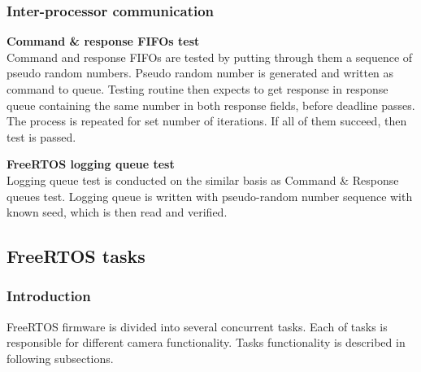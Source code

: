 \subsubsection{Inter-processor communication}

\begin{description}
\item \textbf{Command \& response FIFOs test} \hfill \\
Command and response FIFOs are tested by putting through them a sequence of pseudo random numbers. Pseudo random number is generated and written as command to queue. Testing routine then expects to get response in response queue containing the same number in both response fields, before deadline passes. The process is repeated for set number of iterations. If all of them succeed, then test is passed.

\item \textbf{FreeRTOS logging queue test} \hfill \\
Logging queue test is conducted on the similar basis as Command \& Response queues test. Logging queue is written with pseudo-random number sequence with known seed, which is then read and verified.
\end{description}

\subsection{FreeRTOS tasks}

\subsubsection{Introduction}
FreeRTOS firmware is divided into several concurrent tasks. Each of tasks is responsible for different camera functionality. Tasks functionality is described in following subsections.

